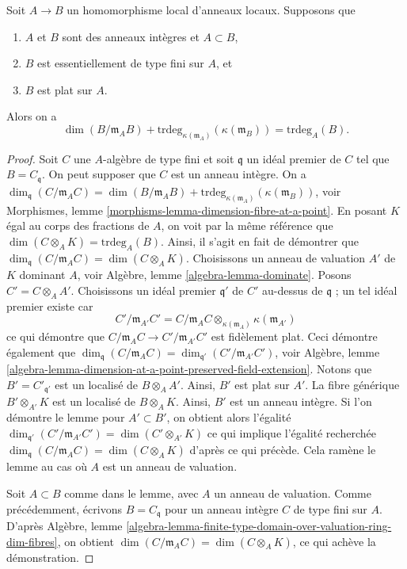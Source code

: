 \begin{lemma}
\label{lemma-equality-dimensions}
Soit $A \to B$ un homomorphisme local d'anneaux locaux. Supposons que
\begin{enumerate}
\item $A$ et $B$ sont des anneaux intègres et $A \subset B$,
\item $B$ est essentiellement de type fini sur $A$, et
\item $B$ est plat sur $A$.
\end{enumerate}
Alors on a
$$
\dim(B/\mathfrak m_AB) +
\text{trdeg}_{\kappa(\mathfrak m_A)}(\kappa(\mathfrak m_B)) =
\text{trdeg}_A(B).
$$
\end{lemma}

\begin{proof}
Soit $C$ une $A$-algèbre de type fini et soit $\mathfrak q$ un idéal premier de $C$
tel que $B = C_{\mathfrak q}$. On peut supposer que $C$ est un anneau intègre.
On a
$\dim_{\mathfrak q}(C/\mathfrak m_AC) = \dim(B/\mathfrak m_AB) +
\text{trdeg}_{\kappa(\mathfrak m_A)}(\kappa(\mathfrak m_B))$, voir
Morphismes, lemme \ref{morphisms-lemma-dimension-fibre-at-a-point}.
En posant $K$ égal au corps des fractions de $A$,
on voit par la même référence que
$\dim(C \otimes_A K) = \text{trdeg}_A(B)$.
Ainsi, il s'agit en fait de démontrer que
$\dim_{\mathfrak q}(C/\mathfrak m_AC) = \dim(C \otimes_A K)$.
Choisissons un anneau de valuation $A'$ de $K$ dominant $A$, voir
Algèbre, lemme \ref{algebra-lemma-dominate}.
Posons $C' = C \otimes_A A'$.
Choisissons un idéal premier $\mathfrak q'$ de $C'$ au-dessus de $\mathfrak q$ ; un tel
idéal premier existe car
$$
C'/\mathfrak m_{A'}C' =
C/\mathfrak m_AC \otimes_{\kappa(\mathfrak m_A)} \kappa(\mathfrak m_{A'})
$$
ce qui démontre que $C/\mathfrak m_AC \to C'/\mathfrak m_{A'}C'$ est fidèlement
plat. Ceci démontre également que
$\dim_{\mathfrak q}(C/\mathfrak m_AC) =
\dim_{\mathfrak q'}(C'/\mathfrak m_{A'}C')$, voir
Algèbre,
lemme \ref{algebra-lemma-dimension-at-a-point-preserved-field-extension}.
Notons que $B' = C'_{\mathfrak q'}$ est un localisé de $B \otimes_A A'$.
Ainsi, $B'$ est plat sur $A'$. La fibre générique $B' \otimes_{A'} K$
est un localisé de $B \otimes_A K$. Ainsi, $B'$ est un anneau intègre.
Si l'on démontre le lemme pour $A' \subset B'$, on obtient alors l'égalité
$\dim_{\mathfrak q'}(C'/\mathfrak m_{A'}C') = \dim(C' \otimes_{A'} K)$
ce qui implique l'égalité recherchée
$\dim_{\mathfrak q}(C/\mathfrak m_AC) = \dim(C \otimes_A K)$
d'après ce qui précède. Cela ramène le
lemme au cas où $A$ est un anneau de valuation.

\medskip\noindent
Soit $A \subset B$ comme dans le lemme, avec $A$ un anneau de valuation.
Comme précédemment, écrivons $B = C_{\mathfrak q}$ pour un anneau intègre $C$ de type
fini sur $A$. D'après
Algèbre,
lemme \ref{algebra-lemma-finite-type-domain-over-valuation-ring-dim-fibres},
on obtient $\dim(C/\mathfrak m_AC) = \dim(C \otimes_A K)$, ce qui achève la démonstration.
\end{proof}


